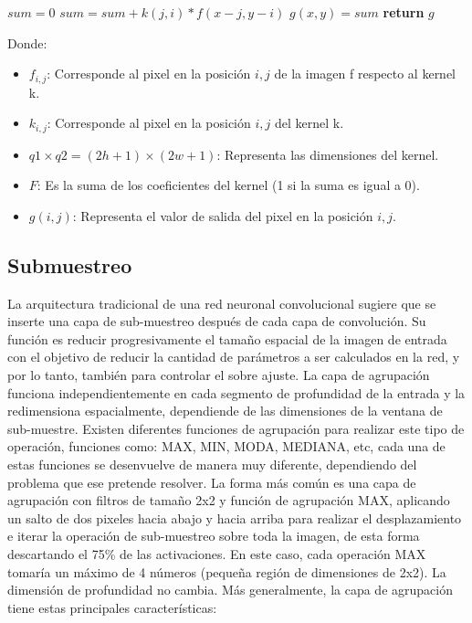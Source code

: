 \begin{itemize}
{\begin{algorithm}
\begin{algorithmic}[H]

  \State $sum=0$
           \State $sum=sum + k(j,i)*f(x-j,y-i)$
		\EndFor
	 \EndFor 
  \State $g(x,y)=sum$
\EndFor
\EndFor
\State \textbf{return} $g$
\EndProcedure
\end{algorithmic}
\end{algorithm}

Donde:
\begin{itemize}
\item $f_{i,j}$: Corresponde al pixel en la posición $i,j$ de la imagen f respecto al kernel k.
\item $k_{i,j}$: Corresponde al pixel en la posición $i,j$ del kernel k.
\item $q1\times q2 = (2h+1)\times(2w+1)$: Representa las dimensiones del kernel.
\item $F$: Es la suma de los coeficientes del kernel (1 si la suma es igual a 0).
\item $g(i,j)$: Representa el valor de salida del pixel en la posición $i,j$.
\end{itemize}}

\end{itemize}

\subsection{Submuestreo}
La arquitectura tradicional de una red neuronal convolucional sugiere que se inserte una capa de sub-muestreo después de cada capa de convolución. Su función es reducir progresivamente el tamaño espacial de la imagen de entrada con el objetivo de reducir la cantidad de parámetros a ser calculados en la red, y por lo tanto, también para controlar el sobre ajuste. La capa de agrupación funciona independientemente en cada segmento de profundidad de la entrada y la redimensiona espacialmente, dependiende de las dimensiones de la ventana de sub-muestre. Existen diferentes funciones de agrupación para realizar este tipo de operación, funciones como: MAX, MIN, MODA, MEDIANA, etc, cada una de estas funciones se desenvuelve de manera muy diferente, dependiendo del problema que ese pretende resolver. La forma más común es una capa de agrupación con filtros de tamaño 2x2 y función de agrupación MAX, aplicando un salto de dos pixeles hacia abajo y hacia arriba para realizar el desplazamiento e iterar la operación de sub-muestreo sobre toda la imagen, de esta forma descartando el 75\% de las activaciones. En este caso, cada operación MAX tomaría un máximo de 4 números (pequeña región de dimensiones de 2x2). La dimensión de profundidad no cambia. Más generalmente, la capa de agrupación tiene estas principales características:

